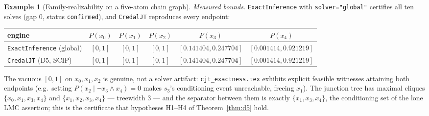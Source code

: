\documentclass[11pt]{article}
\theoremstyle{definition}
\newtheorem{example}{Example}
\begin{document}
\begin{example}[Family-realizability on a five-atom chain graph]
\noindent\emph{Measured bounds.} \texttt{ExactInference} with \texttt{solver="global"} certifies all
ten solves (gap $0$, status \texttt{confirmed}), and \texttt{CredalJT} reproduces every endpoint:
\begin{center}\small
\begin{tabular}{@{}lccccc@{}}
\toprule
engine & $P(x_0)$ & $P(x_1)$ & $P(x_2)$ & $P(x_3)$ & $P(x_4)$ \\
\midrule
\texttt{ExactInference} (global) & $[0,1]$ & $[0,1]$ & $[0,1]$ & $[0.141404,0.247704]$ & $[0.001414,0.921219]$ \\
\texttt{CredalJT} (D5, SCIP)     & $[0,1]$ & $[0,1]$ & $[0,1]$ & $[0.141404,0.247704]$ & $[0.001414,0.921219]$ \\
\bottomrule
\end{tabular}
\end{center}
The vacuous $[0,1]$ on $x_0,x_1,x_2$ is genuine, not a solver artifact: \texttt{cjt\_exactness.tex}
exhibits explicit feasible witnesses attaining both endpoints (e.g.\ setting
$P(x_2\mid\lnot x_3\wedge x_4)=0$ makes $s_3$'s conditioning event unreachable, freeing $x_1$).
The junction tree has maximal cliques $\{x_0,x_1,x_3,x_4\}$ and $\{x_1,x_2,x_3,x_4\}$ --- treewidth
$3$ --- and the separator between them is exactly $\{x_1,x_3,x_4\}$, the conditioning set of the lone
LMC assertion; this is the certificate that hypotheses H1--H4 of Theorem~\ref{thm:d5} hold.
\end{example}
\end{document}

